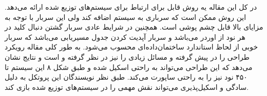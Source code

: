 \documentclass[a4paper, 12pt]{article}
\begin{document}
در کل این مقاله یه روش قابل
برای ارتباط
برای سیستم‌های توزیع شده ارائه می‌دهد.
این روش ممکن است که سرباری به سیستم اضافه کند ولی این سربار با توجه به مزایای بالا
قابل چشم پوشی است.
همچنین در شرایط عادی سربار گشتن دنبال کلید در هر نود از اوردر
می‌باشد و سربار آپدیت کردن جدول مسیر‌یابی
می‌باشد که سربار خوبی از لحاظ استاندارد ساختمان‌داده‌ای محسوب می‌شود.
به طور کلی مقاله رویکرد طراحی را در پیش گرفته و مسائل زیادی را نیز در نظر گرفته و است
و نتایج نشان می‌دهد که این طراحی می‌تواند به راحتی اسکیل شده و طبق شکل ۸ این سیستم تا ۴۵۰ نود
نیز را به راحتی ساپورت می‌کند.
طبق نظر نویسندگان این پروتکل به دلیل سادگی و اسکیل‌پذیری می‌تواند نقش مهمی را در سیستم‌های
توزیع شده بازی کند.
\end{document}
